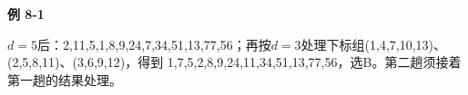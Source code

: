 {\color{ink}\bfseries 例 8-1}\par\vspace{1bp}\(d=\allowbreak{}5\)后：2,\allowbreak{}11,\allowbreak{}5,\allowbreak{}1,\allowbreak{}8,\allowbreak{}9,\allowbreak{}24,\allowbreak{}7,\allowbreak{}34,\allowbreak{}51,\allowbreak{}13,\allowbreak{}77,\allowbreak{}56；再按\(d=\allowbreak{}3\)处理下标组(1,\allowbreak{}4,\allowbreak{}7,\allowbreak{}10,\allowbreak{}13)、(2,\allowbreak{}5,\allowbreak{}8,\allowbreak{}11)、(3,\allowbreak{}6,\allowbreak{}9,\allowbreak{}12)，得到 1,\allowbreak{}7,\allowbreak{}5,\allowbreak{}2,\allowbreak{}8,\allowbreak{}9,\allowbreak{}24,\allowbreak{}11,\allowbreak{}34,\allowbreak{}51,\allowbreak{}13,\allowbreak{}77,\allowbreak{}56，选B。第二趟须接着第一趟的结果处理。
